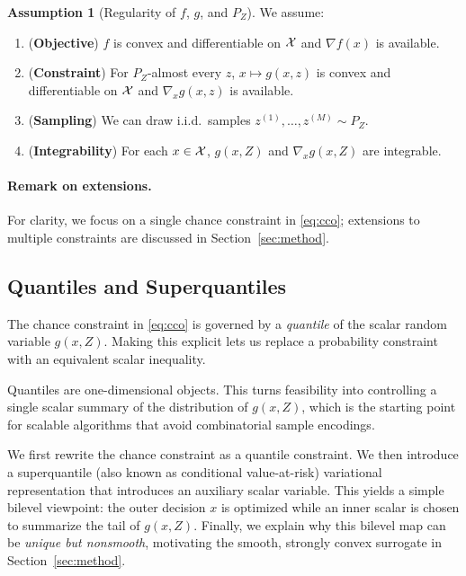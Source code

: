 \documentclass{uai2026} %
\theoremstyle{plain}
\theoremstyle{definition}
\newtheorem{assumption}{Assumption}
\begin{document}
\begin{assumption}[Regularity of $f$, $g$, and $P_Z$]\label{ass:setup}
We assume:
\begin{enumerate}
  \item (\textbf{Objective}) $f$ is convex and differentiable on $\mathcal{X}$ and $\nabla f(x)$ is available.
  \item (\textbf{Constraint}) For $P_Z$-almost every $z$, $x\mapsto g(x,z)$ is convex and differentiable on $\mathcal{X}$ and $\nabla_x g(x,z)$ is available.
  \item (\textbf{Sampling}) We can draw i.i.d.\ samples $z^{(1)},\dots,z^{(M)}\sim P_Z$.
  \item (\textbf{Integrability}) For each $x\in\mathcal{X}$, $g(x,Z)$ and $\nabla_x g(x,Z)$ are integrable.
\end{enumerate}
\end{assumption}

\paragraph{Remark on extensions.}
For clarity, we focus on a single chance constraint in \eqref{eq:cco}; extensions to multiple constraints are discussed in Section~\ref{sec:method}.

\subsection{Quantiles and Superquantiles}\label{sec:background}
The chance constraint in \eqref{eq:cco} is governed by a \emph{quantile} of the scalar random variable $g(x,Z)$.
Making this explicit lets us replace a probability constraint with an equivalent scalar inequality.

Quantiles are one-dimensional objects.
This turns feasibility into controlling a single scalar summary of the distribution of $g(x,Z)$, which is the starting point for scalable algorithms that avoid combinatorial sample encodings.

We first rewrite the chance constraint as a quantile constraint.
We then introduce a superquantile (also known as conditional value-at-risk) variational representation that introduces an auxiliary scalar variable.
This yields a simple bilevel viewpoint: the outer decision $x$ is optimized while an inner scalar is chosen to summarize the tail of $g(x,Z)$.
Finally, we explain why this bilevel map can be \emph{unique but nonsmooth}, motivating the smooth, strongly convex surrogate in Section~\ref{sec:method}.
\end{document}
